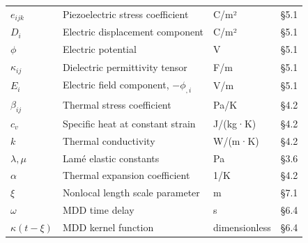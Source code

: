 \begin{table}[h]
\begin{tabularx}{\textwidth}{@{}lXlr@{}}
$e_{ijk}$ & Piezoelectric stress coefficient & C/m² & §5.1 \\
$D_i$ & Electric displacement component & C/m² & §5.1 \\
$\phi$ & Electric potential & V & §5.1 \\
$\kappa_{ij}$ & Dielectric permittivity tensor & F/m & §5.1 \\
$E_i$ & Electric field component, $-\phi_{,i}$ & V/m & §5.1 \\
$\beta_{ij}$ & Thermal stress coefficient & Pa/K & §4.2 \\
$c_v$ & Specific heat at constant strain & J/(kg·K) & §4.2 \\
$k$ & Thermal conductivity & W/(m·K) & §4.2 \\
$\lambda, \mu$ & Lamé elastic constants & Pa & §3.6 \\
$\alpha$ & Thermal expansion coefficient & 1/K & §4.2 \\
$\xi$ & Nonlocal length scale parameter & m & §7.1 \\
$\omega$ & MDD time delay & s & §6.4 \\
$\kappa(t-\xi)$ & MDD kernel function & dimensionless & §6.4 \\
\bottomrule
\end{tabularx}
\end{table}
